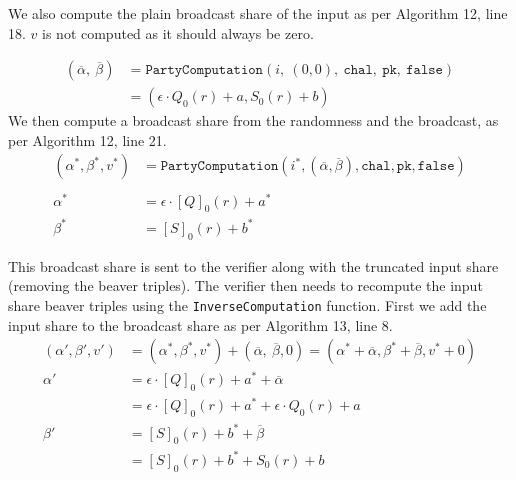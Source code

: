 \documentclass[twoside,11pt,openright]{report}
\begin{document}
We also compute the plain broadcast share of the input as per Algorithm 12, line 18. $v$ is not computed as it should always be zero.

\begin{align*}
  (\overline{\alpha},\ \overline{\beta}) & =
  \texttt{PartyComputation}(i,\ (0,0),\ \texttt{chal},\ \texttt{pk},\ \texttt{false}) \\
                                         & = (\epsilon \cdot Q_0(r) + a, S_0(r)  + b)
\end{align*}
We then compute a broadcast share from the randomness and the broadcast, as per Algorithm 12, line 21.
\begin{align*}
  (\alpha^*, \beta^*, v^*) & = \texttt{PartyComputation}(i^*, (\overline{\alpha},
  \overline{\beta}), \texttt{chal}, \texttt{pk}, \texttt{false})                  \\\\
  \alpha^*                 & = \epsilon \cdot {[Q]}_0(r) + a^*                    \\
  \beta^*                  & = {[S]}_0(r) + b^*
\end{align*}

This broadcast share is sent to the verifier along with the truncated input share (removing the beaver triples). The verifier then needs to recompute the input share beaver triples using the \texttt{InverseComputation} function. First we add the input share to the broadcast share as per Algorithm 13, line 8.
\begin{align*}
  (\alpha', \beta', v') & = (\alpha^*, \beta^*, v^*) + (\overline{\alpha},\ \overline{\beta}, 0)
  = (\alpha^* + \overline{\alpha}, \beta^* + \overline{\beta}, v^* + 0)                          \\
  \alpha'               & = \epsilon \cdot {[Q]}_0(r) + a^* + \overline{\alpha}                  \\
                        & = \epsilon \cdot {[Q]}_0(r) + a^* + \epsilon \cdot Q_0(r) + a          \\
  \beta'                & = {[S]}_0(r) + b^* + \overline{\beta}                                  \\
                        & = {[S]}_0(r) + b^* + S_0(r) + b                                        \\
\end{align*}
\end{document}
